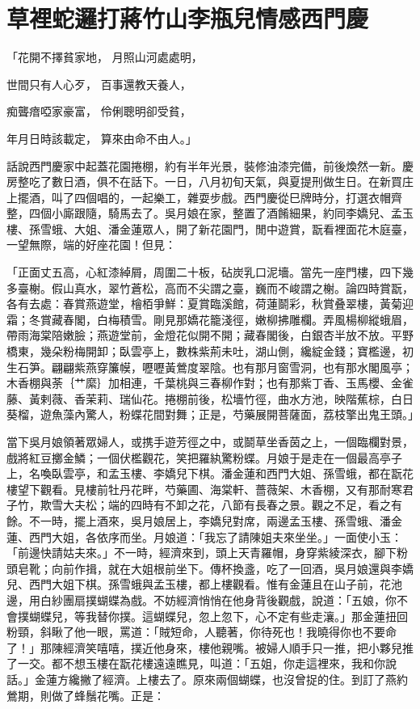 %

\chapter{草裡蛇邏打蔣竹山\KG 李瓶兒情感西門慶}

\begin{showcontents}{}



「花開不擇貧家地，  月照山河處處明，

世間只有人心歹，  百事還教天養人，

痴聾瘖啞家豪富，  伶俐聰明卻受貧，

年月日時該載定，  算來由命不由人。」

話說西門慶家中起蓋花園捲棚，約有半年光景，裝修油漆完備，前後煥然一新。慶房整吃了數日酒，俱不在話下。一日，八月初旬天氣，與夏提刑做生日。在新買庄上擺酒，叫了四個唱的，一起樂工，雜耍步戲。西門慶從巳牌時分，打選衣帽齊整，四個小廝跟隨，騎馬去了。吳月娘在家，整置了酒餚細果，約同李嬌兒、孟玉樓、孫雪蛾、大姐、潘金蓮眾人，開了新花園門，閒中遊賞，翫看裡面花木庭臺，一望無際，端的好座花園！但見：

「正面丈五高，心紅漆綽屑，周圍二十板，砧炭乳口泥墻。當先一座門樓，四下幾多臺榭。假山真水，翠竹蒼松，高而不尖謂之臺，巍而不峻謂之榭。論四時賞翫，各有去處：春賞燕遊堂，檜栢爭鮮：夏賞臨溪館，荷蓮鬬彩，秋賞叠翠樓，黃菊迎霜；冬賞藏春閣，白梅積雪。剛見那嬌花籠淺徑，嫩柳拂雕欄。弄風楊柳縱蛾眉，帶雨海棠陪嫩臉；燕遊堂前，金燈花似開不開；藏春閣後，白銀杏半放不放。平野橋東，幾朵粉梅開卸；臥雲亭上，數株紫荊未吐，湖山側，纔綻金錢；寶檻邊，初生石笋。翩翩紫燕穿簾幙，嚦嚦黃鶯度翠陰。也有那月窗雪洞，也有那水閣風亭；木香棚與荼｛艹縻｝加相連，千葉桃與三春柳作對；也有那紫丁香、玉馬櫻、金雀藤、黃剌薇、香茉莉、瑞仙花。捲棚前後，松墻竹徑，曲水方池，映階蕉棕，白日葵榴，遊魚藻內驚人，粉蝶花間對舞；正是，芍藥展開菩薩面，荔枝擎出鬼王頭。」

當下吳月娘領著眾婦人，或携手遊芳徑之中，或鬬草坐香茵之上，一個臨欄對景，戲將紅豆擲金鱗；一個伏檻觀花，笑把羅紈驚粉蝶。月娘于是走在一個最高亭子上，名喚臥雲亭，和孟玉樓、李嬌兒下棋。潘金蓮和西門大姐、孫雪蛾，都在翫花樓望下觀看。見樓前牡丹花畔，芍藥圃、海棠軒、薔薇架、木香棚，又有那耐寒君子竹，欺雪大夫松；端的四時有不卸之花，八節有長春之景。觀之不足，看之有餘。不一時，擺上酒來，吳月娘居上，李嬌兒對席，兩邊孟玉樓、孫雪蛾、潘金蓮、西門大姐，各依序而坐。月娘道：「我忘了請陳姐夫來坐坐。」一面使小玉：「前邊快請姑夫來。」不一時，經濟來到，頭上天青羅帽，身穿紫綾深衣，腳下粉頭皂靴；向前作揖，就在大姐根前坐下。傳杯換盞，吃了一回酒，吳月娘還與李嬌兒、西門大姐下棋。孫雪蛾與孟玉樓，都上樓觀看。惟有金蓮且在山子前，花池邊，用白紗團扇撲蝴蝶為戲。不妨經濟悄悄在他身背後觀戲，說道：「五娘，你不會撲蝴蝶兒，等我替你撲。這蝴蝶兒，忽上忽下，心不定有些走瀼。」那金蓮扭回粉頸，斜瞅了他一眼，罵道：「賊短命，人聽著，你待死也！我曉得你也不要命了！」那陳經濟笑嘻嘻，撲近他身來，樓他親嘴。被婦人順手只一推，把小夥兒推了一交。都不想玉樓在翫花樓遠遠瞧見，叫道：「五姐，你走這裡來，我和你說話。」金蓮方纔撇了經濟。上樓去了。原來兩個蝴蝶，也沒曾捉的住。到訂了燕約鶯期，則做了蜂鬚花嘴。正是：


\end{showcontents}
